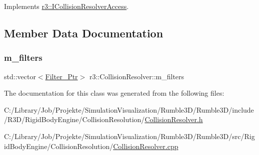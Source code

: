 Implements \mbox{\hyperlink{classr3_1_1_i_collision_resolver_access_a266dfbc4c421a7c3429ef474d63fd941}{r3\+::\+I\+Collision\+Resolver\+Access}}.



\subsection{Member Data Documentation}
\mbox{\label{classr3_1_1_collision_resolver_abf1234ad45ba7f114b31950c90ccaaff}} 
\subsubsection{\texorpdfstring{m\+\_\+filters}{m\_filters}}
{\footnotesize\ttfamily std\+::vector$<$\mbox{\hyperlink{classr3_1_1_collision_resolver_ad1c9ca40341498c0fe4d483d21c8eb9b}{Filter\+\_\+\+Ptr}}$>$ r3\+::\+Collision\+Resolver\+::m\+\_\+filters\hspace{0.3cm}{\ttfamily [protected]}}



The documentation for this class was generated from the following files\+:\begin{DoxyCompactItemize}
\item 
C\+:/\+Library/\+Job/\+Projekte/\+Simulation\+Visualization/\+Rumble3\+D/\+Rumble3\+D/include/\+R3\+D/\+Rigid\+Body\+Engine/\+Collision\+Resolution/\mbox{\hyperlink{_collision_resolver_8h}{Collision\+Resolver.\+h}}\item 
C\+:/\+Library/\+Job/\+Projekte/\+Simulation\+Visualization/\+Rumble3\+D/\+Rumble3\+D/src/\+Rigid\+Body\+Engine/\+Collision\+Resolution/\mbox{\hyperlink{_collision_resolver_8cpp}{Collision\+Resolver.\+cpp}}\end{DoxyCompactItemize}
